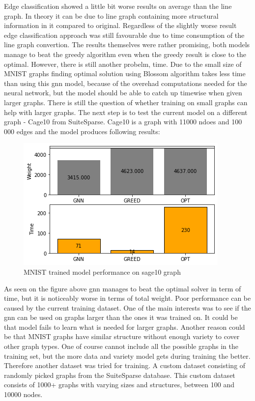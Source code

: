Edge classification showed a little bit worse results on average than the line graph. In theory it can be due to line graph containing more structural information in it compared to original. Regardless of the slightly worse result edge classification approach was still favourable due to time consumption of the line graph convertion. The results themselves were rather promising, both models manage to beat the greedy algorithm even when the greedy result is close to the optimal. However, there is still another probelm, time. Due to the small size of MNIST graphs finding optimal solution using Blossom algorithm takes less time than using this \gls{gnn} model, because of the overehad computations needed for the neural network, but the model should be able to catch up timewise when given larger graphs. There is still the question of whether training on small graphs can help with larger graphs. The next step is to test the current model on a different graph - Cage10 from SuiteSparse. Cage10 is a graph with 11000 ndoes and 100 000 edges and the model produces following results: 

\begin{figure}[H]
    \centering
    \includegraphics[scale=1.0]{figures/MNISTtrainSAGE10}
    \caption{MNIST trained model performance on sage10 graph}
    \label{model performance}
\end{figure}

As seen on the figure above \gls{gnn} manages to beat the optimal solver in term of time, but it is noticeably worse in terms of total weight. Poor performance can be caused by the current training dataset. One of the main interests was to see if the \gls{gnn} can be used on graphs larger than the ones it was trained on. It could be that model fails to learn what is needed for larger graphs. Another reason could be that MNIST graphs have similar structure without enough variety to cover other graph types. One of course cannot include all the possible graphs in the training set, but the more data and variety model gets during training the better. Therefore another dataset was tried for training. A custom dataset consisting of randomly picked graphs from the SuiteSparse database. This custom dataset consists of 1000+ graphs with varying sizes and structures, between 100 and 10000 nodes.

